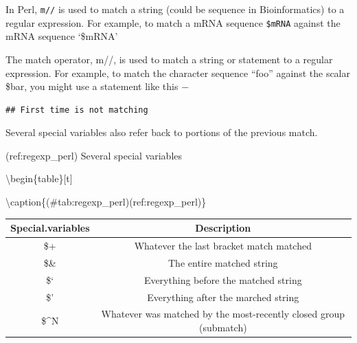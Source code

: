 \documentclass[]{book}
\makeatletter
\newenvironment{Shaded}{\begin{snugshade}}{\end{snugshade}}
\newcommand{\CharTok}[1]{\textcolor[rgb]{0.31,0.60,0.02}{#1}}
\newcommand{\DataTypeTok}[1]{\textcolor[rgb]{0.13,0.29,0.53}{#1}}
\newcommand{\FunctionTok}[1]{\textcolor[rgb]{0.00,0.00,0.00}{#1}}
\newcommand{\KeywordTok}[1]{\textcolor[rgb]{0.13,0.29,0.53}{\textbf{#1}}}
\newcommand{\NormalTok}[1]{#1}
\newcommand{\OtherTok}[1]{\textcolor[rgb]{0.56,0.35,0.01}{#1}}
\newcommand{\StringTok}[1]{\textcolor[rgb]{0.31,0.60,0.02}{#1}}
\newenvironment{kframe}{%
\medskip{}
\setlength{\fboxsep}{.8em}
 \def\at@end@of@kframe{}%
 \ifinner\ifhmode%
  \def\at@end@of@kframe{\end{minipage}}%
  \begin{minipage}{\columnwidth}%
 \fi\fi%
 \def\FrameCommand##1{\hskip\@totalleftmargin \hskip-\fboxsep
 \colorbox{shadecolor}{##1}\hskip-\fboxsep
     \hskip-\linewidth \hskip-\@totalleftmargin \hskip\columnwidth}%
 \MakeFramed {\advance\hsize-\width
   \@totalleftmargin\z@ \linewidth\hsize
   \@setminipage}}%
 {\par\unskip\endMakeFramed%
 \at@end@of@kframe}
\renewenvironment{Shaded}{\begin{kframe}}{\end{kframe}}
\makeatother
\begin{document}
In Perl, \texttt{m//} is used to match a string (could be sequence in Bioinformatics) to a regular expression. For example, to match a mRNA sequence \texttt{\$mRNA} against the mRNA sequence `\$mRNA'

The match operator, m//, is used to match a string or statement to a regular expression. For example, to match the character sequence ``foo'' against the scalar \$bar, you might use a statement like this −

\begin{Shaded}
\end{Shaded}

\begin{verbatim}
## First time is not matching
\end{verbatim}

Several special variables also refer back to portions of the previous match.

(ref:regexp\_perl) Several special variables

\textbackslash{}begin\{table\}{[}t{]}

\textbackslash{}caption\{(\#tab:regexp\_perl)(ref:regexp\_perl)\}
\centering

\begin{tabular}{c|c}
\hline
Special.variables & Description\\
\hline
\$+ & Whatever the last bracket match matched\\
\hline
\$\& & The entire matched string\\
\hline
\$` & Everything before the matched string\\
\hline
\$' & Everything after the marched string\\
\hline
\$\textasciicircum{}N & Whatever was matched by the most-recently closed group (submatch)\\
\hline
\end{tabular}
\end{document}
